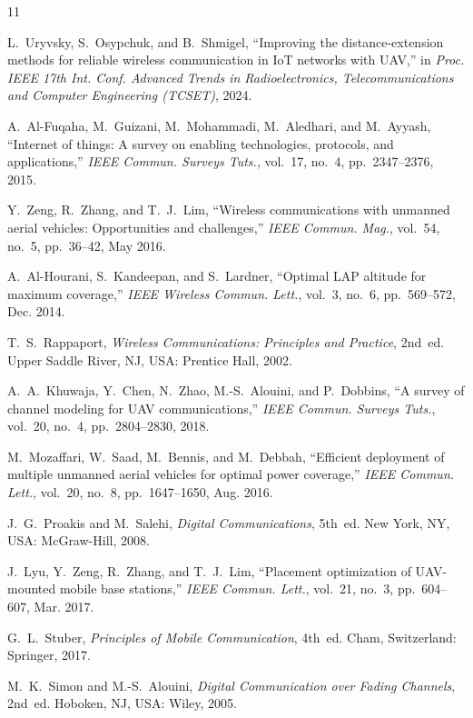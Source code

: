 \documentclass[conference]{IEEEtran}
\begin{document}
\begin{thebibliography}{11}

L.~Uryvsky, S.~Osypchuk, and B.~Shmigel, ``Improving the distance-extension methods for reliable wireless communication in IoT networks with UAV,'' in \textit{Proc. IEEE 17th Int. Conf. Advanced Trends in Radioelectronics, Telecommunications and Computer Engineering (TCSET)}, 2024.

A.~Al-Fuqaha, M.~Guizani, M.~Mohammadi, M.~Aledhari, and M.~Ayyash, ``Internet of things: A survey on enabling technologies, protocols, and applications,'' \textit{IEEE Commun. Surveys Tuts.}, vol.~17, no.~4, pp.~2347--2376, 2015.

Y.~Zeng, R.~Zhang, and T.~J.~Lim, ``Wireless communications with unmanned aerial vehicles: Opportunities and challenges,'' \textit{IEEE Commun. Mag.}, vol.~54, no.~5, pp.~36--42, May 2016.

A.~Al-Hourani, S.~Kandeepan, and S.~Lardner, ``Optimal LAP altitude for maximum coverage,'' \textit{IEEE Wireless Commun. Lett.}, vol.~3, no.~6, pp.~569--572, Dec. 2014.

T.~S.~Rappaport, \textit{Wireless Communications: Principles and Practice}, 2nd~ed. Upper Saddle River, NJ, USA: Prentice Hall, 2002.

A.~A.~Khuwaja, Y.~Chen, N.~Zhao, M.-S.~Alouini, and P.~Dobbins, ``A survey of channel modeling for UAV communications,'' \textit{IEEE Commun. Surveys Tuts.}, vol.~20, no.~4, pp.~2804--2830, 2018.

M.~Mozaffari, W.~Saad, M.~Bennis, and M.~Debbah, ``Efficient deployment of multiple unmanned aerial vehicles for optimal power coverage,'' \textit{IEEE Commun. Lett.}, vol.~20, no.~8, pp.~1647--1650, Aug. 2016.

J.~G.~Proakis and M.~Salehi, \textit{Digital Communications}, 5th~ed. New York, NY, USA: McGraw-Hill, 2008.

J.~Lyu, Y.~Zeng, R.~Zhang, and T.~J.~Lim, ``Placement optimization of UAV-mounted mobile base stations,'' \textit{IEEE Commun. Lett.}, vol.~21, no.~3, pp.~604--607, Mar. 2017.

G.~L.~Stuber, \textit{Principles of Mobile Communication}, 4th~ed. Cham, Switzerland: Springer, 2017.

M.~K.~Simon and M.-S.~Alouini, \textit{Digital Communication over Fading Channels}, 2nd~ed. Hoboken, NJ, USA: Wiley, 2005.

\end{thebibliography}
\end{document}
